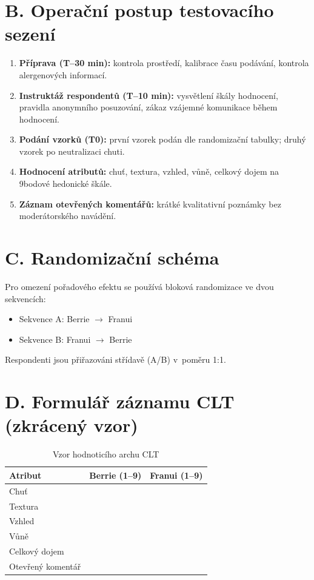 \section*{B. Operační postup testovacího sezení}
\begin{enumerate}
  \item \textbf{Příprava (T--30 min):} kontrola prostředí, kalibrace času podávání, kontrola alergenových informací.
  \item \textbf{Instruktáž respondentů (T--10 min):} vysvětlení škály hodnocení, pravidla anonymního posuzování, zákaz vzájemné komunikace během hodnocení.
  \item \textbf{Podání vzorků (T0):} první vzorek podán dle randomizační tabulky; druhý vzorek po neutralizaci chuti.
  \item \textbf{Hodnocení atributů:} chuť, textura, vzhled, vůně, celkový dojem na 9bodové hedonické škále.
  \item \textbf{Záznam otevřených komentářů:} krátké kvalitativní poznámky bez moderátorského navádění.
\end{enumerate}

\section*{C. Randomizační schéma}

Pro omezení pořadového efektu se používá bloková randomizace ve dvou sekvencích:
\begin{itemize}
  \item Sekvence A: Berrie $\rightarrow$ Franui
  \item Sekvence B: Franui $\rightarrow$ Berrie
\end{itemize}

Respondenti jsou přiřazováni střídavě (A/B) v~poměru 1:1.

\section*{D. Formulář záznamu CLT (zkrácený vzor)}
\begin{table}[H]
\centering
\caption{Vzor hodnoticího archu CLT}
\label{tab:clt_form}
\begin{tabularx}{\textwidth}{lcc}
\toprule
\textbf{Atribut} & \textbf{Berrie (1--9)} & \textbf{Franui (1--9)} \\
\midrule
Chuť & & \\
Textura & & \\
Vzhled & & \\
Vůně & & \\
Celkový dojem & & \\
\midrule
Otevřený komentář & \multicolumn{2}{X}{\vspace{1.2cm}} \\
\bottomrule
\end{tabularx}
\end{table}

